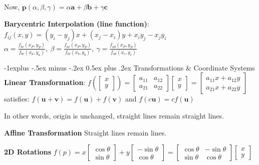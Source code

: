 \documentclass[letterpaper, 8pt]{extarticle}
\makeatletter
\renewcommand{\section}{\@startsection{section}{1}{0mm}%
                                {-1explus -.5ex minus -.2ex}%
                                {0.5ex plus .2ex}%
                                {\normalfont\normalsize\bfseries}}
\makeatother
\begin{document}
\begin{multicols*}{4}
Now,
\(
\mathbf{p}(\alpha, \beta, \gamma)
= \alpha \mathbf{a} + \beta \mathbf{b} + \gamma \mathbf{c}
\)

\textbf{Barycentric Interpolation (line function)}:
$f_{ij}(x, y) = (y_i - y_j) x + (x_j - x_i)y + x_i y_j - x_j y_i$ \\
$\alpha = \frac{f_{bc}(x_P, y_P)}{f_{bc}(x_a, y_a)},\
\beta = \frac{f_{ac}(x_P, y_P)}{f_{bc}(x_b, y_b)},\
\gamma = \frac{f_{ab}(x_P, y_P)}{f_{ab}(x_c, y_c)}$

\section{Transformations \& Coordinate Systems}
\textbf{Linear Transformation}:
\(
f(\begin{bmatrix}
    x \\ y
\end{bmatrix})
= \begin{bmatrix}
    a_{11} & a_{12} \\
    a_{21} & a_{22}
\end{bmatrix}
\begin{bmatrix}
    x \\ y
\end{bmatrix}
=
\begin{bmatrix}
    a_{11} x + a_{12} y \\
    a_{21} x + a_{22} y
\end{bmatrix}
\)
satisfies: \(
f(\mathbf{u} + \mathbf{v})
= f(\mathbf{u}) + f(\mathbf{v})
\)
and
\(
f(c\mathbf{u}) = cf(\mathbf{u})
\)

In other words, origin is unchanged, straight lines remain straight lines.

\textbf{Affine Transformation}
Straight lines remain lines.

\textbf{2D Rotations}
\(
f(p)
= x \begin{bmatrix}
    \cos \theta \\ \sin \theta
\end{bmatrix}
+ y \begin{bmatrix}
    -\sin \theta \\ \cos \theta
\end{bmatrix}
= \begin{bmatrix}
    \cos \theta & - \sin \theta \\
    \sin \theta & \cos \theta
\end{bmatrix}
\begin{bmatrix}
    x \\ y
\end{bmatrix}
\)


\end{multicols*}
\end{document}

